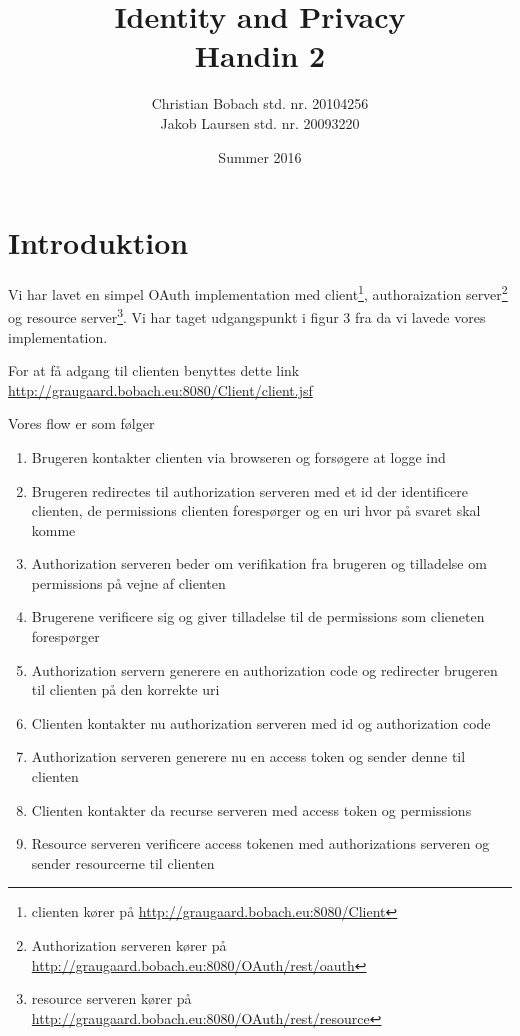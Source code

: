 \documentclass[a4paper,12pt]{article}
\title{Identity and Privacy \\Handin 2}
\author{Christian Bobach std. nr. 20104256\\Jakob Laursen std. nr. 20093220}
\date{Summer 2016}
\theoremstyle{plain}
\theoremstyle{nonumberplain}
\begin{document}
\maketitle
\section*{Introduktion}

Vi har lavet en simpel OAuth implementation med client\footnote{clienten kører på \url{http://graugaard.bobach.eu:8080/Client}}, authoraization server\footnote{Authorization serveren kører på \url{http://graugaard.bobach.eu:8080/OAuth/rest/oauth}} og resource server\footnote{resource serveren kører på \url{http://graugaard.bobach.eu:8080/OAuth/rest/resource}}. Vi har taget udgangspunkt i figur 3 fra \cite{iogp}  da vi lavede vores implementation.

For at få adgang til clienten benyttes dette link \url{http://graugaard.bobach.eu:8080/Client/client.jsf}

Vores flow er som følger
\begin{enumerate}
    \item Brugeren kontakter clienten via browseren og forsøgere at logge ind
    \item Brugeren redirectes til authorization serveren med et id der identificere clienten, de permissions clienten forespørger og en uri hvor på svaret skal komme
    \item Authorization serveren beder om verifikation fra brugeren og tilladelse om permissions på vejne af clienten
    \item Brugerene verificere sig og giver tilladelse til de permissions som clieneten forespørger
    \item Authorization servern generere en authorization code og redirecter brugeren til clienten på den korrekte uri
    \item Clienten kontakter nu authorization serveren med id og authorization code
    \item Authorization serveren generere nu en access token og sender denne til clienten
    \item Clienten kontakter da recurse serveren med access token og permissions
    \item Resource serveren verificere access tokenen med authorizations serveren og sender resourcerne til clienten
\end{enumerate}
\end{document}
